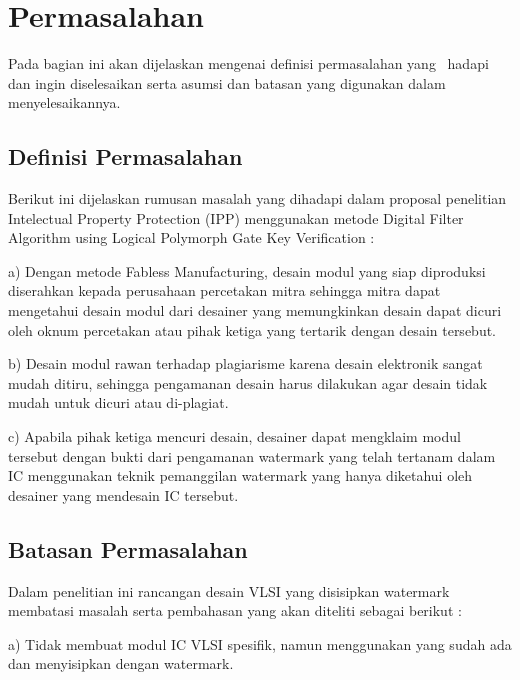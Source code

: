 \section{Permasalahan}
Pada bagian ini akan dijelaskan mengenai definisi permasalahan 
yang \saya~hadapi dan ingin diselesaikan serta asumsi dan batasan 
yang digunakan dalam menyelesaikannya.


\subsection{Definisi Permasalahan}
Berikut ini dijelaskan rumusan masalah yang dihadapi dalam proposal
penelitian Intelectual Property Protection (IPP) menggunakan metode Digital
Filter Algorithm using Logical Polymorph Gate Key Verification :

a) Dengan metode Fabless Manufacturing, desain modul yang siap
diproduksi diserahkan kepada perusahaan percetakan mitra sehingga
mitra dapat mengetahui desain modul dari desainer yang
memungkinkan desain dapat dicuri oleh oknum percetakan atau pihak
ketiga yang tertarik dengan desain tersebut.

b) Desain modul rawan terhadap plagiarisme karena desain elektronik
sangat mudah ditiru, sehingga pengamanan desain harus dilakukan agar
desain tidak mudah untuk dicuri atau di-plagiat.

c) Apabila pihak ketiga mencuri desain, desainer dapat mengklaim modul
tersebut dengan bukti dari pengamanan watermark yang telah tertanam
dalam IC menggunakan teknik pemanggilan watermark yang hanya
diketahui oleh desainer yang mendesain IC tersebut.


\subsection{Batasan Permasalahan}
Dalam penelitian ini rancangan desain VLSI yang disisipkan watermark
membatasi masalah serta pembahasan yang akan diteliti sebagai berikut :

a) Tidak membuat modul IC VLSI spesifik, namun menggunakan yang
sudah ada dan menyisipkan dengan watermark.

